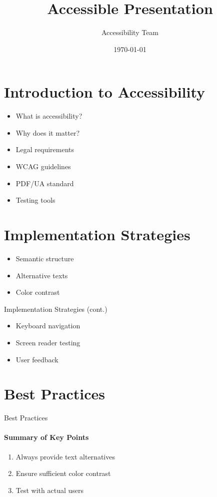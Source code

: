 \documentclass{ltx-talk}
\title{Accessible Presentation}
\author{Accessibility Team}
\institute{University of Inclusive Design}
\date{\today}
\begin{document}
\section{Introduction to Accessibility}

\begin{frame}
  \begin{itemize}
    \item What is accessibility?
    \item Why does it matter?
    \item Legal requirements
  \end{itemize}
\end{frame}

\begin{frame}
  \begin{itemize}
    \item WCAG guidelines
    \item PDF/UA standard
    \item Testing tools
  \end{itemize}
\end{frame}

\section{Implementation Strategies}

\begin{frame}
  \begin{itemize}
    \item Semantic structure
    \item Alternative texts
    \item Color contrast
  \end{itemize}
\end{frame}

\begin{frame}{Implementation Strategies (cont.)}
  \begin{itemize}
    \item Keyboard navigation
    \item Screen reader testing
    \item User feedback
  \end{itemize}
\end{frame}

\section{Best Practices}

\begin{frame}{Best Practices}
  \framesubtitle{Summary of Key Points}
  \begin{enumerate}
    \item Always provide text alternatives
    \item Ensure sufficient color contrast
    \item Test with actual users
  \end{enumerate}
\end{frame}
\end{document}
